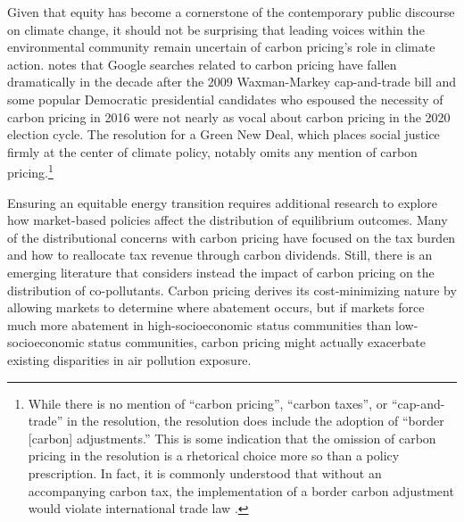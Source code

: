 \documentclass[11pt]{article}
\begin{document}
Given that equity has become a cornerstone of the contemporary public discourse on climate change, it should not be surprising that leading voices within the environmental community remain uncertain of carbon pricing's role in climate action. \cite{fischer2021green} notes that Google searches related to carbon pricing have fallen dramatically in the decade after the 2009 Waxman-Markey cap-and-trade bill and some popular Democratic presidential candidates who espoused the necessity of carbon pricing in 2016 were not nearly as vocal about carbon pricing in the 2020 election cycle. The resolution for a Green New Deal, which places social justice firmly at the center of climate policy, notably omits any mention of carbon pricing.\footnote{While there is no mention of ``carbon pricing'', ``carbon taxes'', or ``cap-and-trade'' in the resolution, the resolution does include the adoption of ``border [carbon] adjustments.'' This is some indication that the omission of carbon pricing in the resolution is a rhetorical choice more so than a policy prescription. In fact, it is commonly understood that without an accompanying carbon tax, the implementation of a border carbon adjustment would violate international trade law \citep{cosbey2019developing}.} 

Ensuring an equitable energy transition requires additional research to explore how market-based policies affect the distribution of equilibrium outcomes. Many of the distributional concerns with carbon pricing have focused on the tax burden and how to reallocate tax revenue through carbon dividends. Still, there is an emerging literature that considers instead the impact of carbon pricing on the distribution of co-pollutants. Carbon pricing derives its cost-minimizing nature by allowing markets to determine where abatement occurs, but if markets force much more abatement in high-socioeconomic status communities than low-socioeconomic status communities, carbon pricing might actually exacerbate existing disparities in air pollution exposure.

\end{document}
